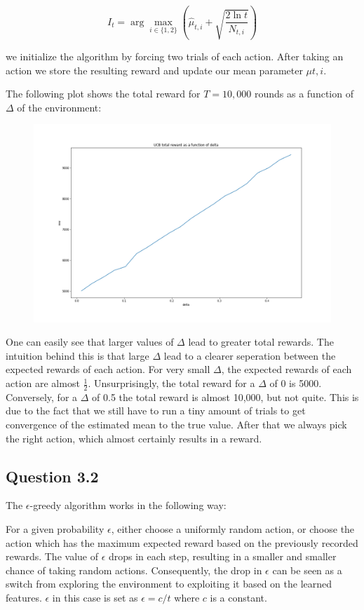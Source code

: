 \documentclass[a4paper, 11pt]{article} %
\begin{document}
$$I_{t}=\arg \max _{i \in\{1,2\}}\left(\widehat{\mu}_{t, i}+\sqrt{\frac{2 \ln t}{N_{t, i}}}\right)$$

we initialize the algorithm by forcing two trials of each action. After taking an action we store the resulting reward and update our mean parameter $\mu{t,i}$. 

The following plot shows the total reward for $T=10,000$ rounds as a function of $\Delta$ of the environment:

\begin{figure}[h]
	\centering
	\includegraphics[scale = 0.4]{UCB_reward}
	\caption{}
\end{figure}

One can easily see that larger values of $\Delta$ lead to greater total rewards. The intuition behind this is that large $\Delta$ lead to a clearer seperation between the expected rewards of each action. For very small $\Delta$, the expected rewards of each action are almost $\frac{1}{2}$. Unsurprisingly, the total reward for a $\Delta$ of 0 is 5000. Conversely, for a $\Delta$ of 0.5 the total reward is almost 10,000, but not quite. This is due to the fact that we still have to run a tiny amount of trials to get convergence of the estimated mean to the true value. After that we always pick the right action, which almost certainly results in a reward.

\subsection*{Question 3.2}

The $\epsilon$-greedy algorithm works in the following way:

For a given probability $\epsilon$, either choose a uniformly random action, or choose the action which has the maximum expected reward based on the previously recorded rewards. The value of $\epsilon$ drops in each step, resulting in a smaller and smaller chance of taking random actions. Consequently, the drop in $\epsilon$ can be seen as a switch from exploring the environment to exploiting it based on the learned features. $\epsilon$ in this case is set as $\epsilon = c/t$ where $c$ is a constant.
\end{document}

